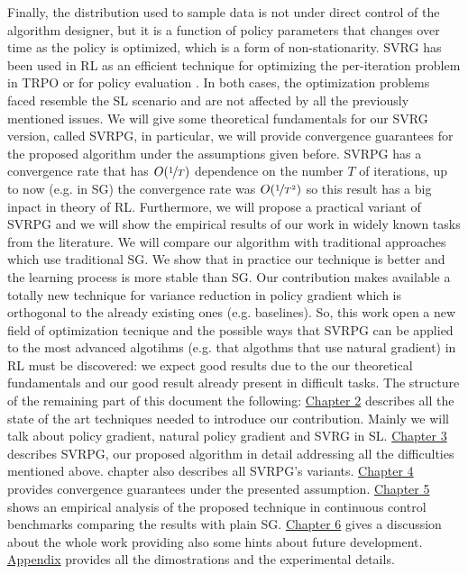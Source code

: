 Finally, the distribution used to sample data is not under direct control of the algorithm designer, but it is a function of policy parameters that changes over time as the policy is optimized, which is a form of non-stationarity. 
\acs{SVRG} has been used in \acs{RL} as an efficient technique for optimizing the per-iteration problem in \ac{TRPO} \citep{xu2017stochastic} or for policy evaluation \citep{du2017stochastic}. In both cases, the optimization problems faced resemble the \acs{SL} scenario and are not affected by all the previously mentioned issues.
We will give some theoretical fundamentals for our \acs{SVRG} version, called \acs{SVRPG}, in particular, we will provide convergence guarantees for the proposed algorithm under the assumptions given before. SVRPG has a convergence rate that has $O(\nicefrac{1}{T})$ dependence on the number $T$ of iterations, up to now (e.g. in \acs{SG}) the convergence rate was  $O(\nicefrac{1}{T^2})$ so this result has a big inpact in theory of \acs{RL}.\newline
 Furthermore, we will propose a practical variant of \acs{SVRPG} and we will show the empirical results of our work in widely known tasks from the literature. We will compare our algorithm with traditional approaches which use traditional \acs{SG}. We show that in practice our technique is better and the learning process is more stable than \acs{SG}.\newline
Our contribution makes available a totally new technique for variance reduction in policy gradient which is orthogonal to the already existing ones (e.g. baselines).
So, this work open a new field of optimization tecnique and the possible ways that \acs{SVRPG} can be applied to the most advanced algotihms (e.g. that algothms that use natural gradient) in \acs{RL} must be discovered: we expect good results due to the our theoretical fundamentals and our good result already present in difficult tasks.\newline
The structure of the remaining part of this document the following:
\hyperref[chap:art]{Chapter 2} describes all the state of the art techniques needed to introduce our contribution. Mainly we will talk about policy gradient, natural policy gradient and \acs{SVRG} in \acs{SL}.\newline
\hyperref[chap:art]{Chapter 3} describes \acs{SVRPG}, our proposed algorithm in detail addressing all the difficulties mentioned above. chapter also describes all \acs{SVRPG}'s variants.\newline
\hyperref[chap:art]{Chapter 4} provides convergence guarantees under the presented assumption.\newline
\hyperref[chap:art]{Chapter 5} shows an empirical analysis of the proposed technique in continuous control benchmarks comparing the results with plain \acs{SG}.\newline
\hyperref[chap:art]{Chapter 6} gives a discussion about the whole work providing also some hints about future development.\newline
\hyperref[chap:art]{Appendix} provides all the dimostrations and the experimental details.
